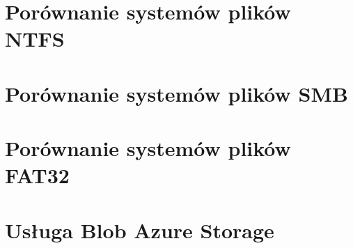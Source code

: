 \section{Porównanie systemów plików NTFS}
\section{Porównanie systemów plików SMB}
\section{Porównanie systemów plików FAT32}
\section{Usługa Blob Azure Storage}